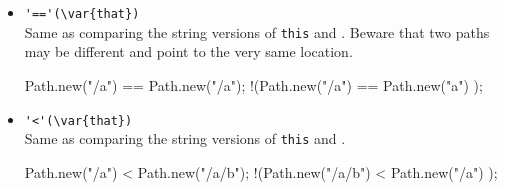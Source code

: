\begin{itemize}
\item \lstinline|'=='(\var{that})|\\
  Same as comparing the string versions of \lstinline|this| and
  .  Beware that two paths may be different and point to the
  very same location.
\begin{urbiassert}[firstnumber=last]
  Path.new("/a")  == Path.new("/a");
!(Path.new("/a")  == Path.new("a")  );
\end{urbiassert}

\item \lstinline|'<'(\var{that})|\\
  Same as comparing the string versions of \lstinline|this| and
  .
\begin{urbiassert}[firstnumber=last]
  Path.new("/a")   < Path.new("/a/b");
!(Path.new("/a/b") < Path.new("/a")  );
\end{urbiassert}

\end{itemize}


